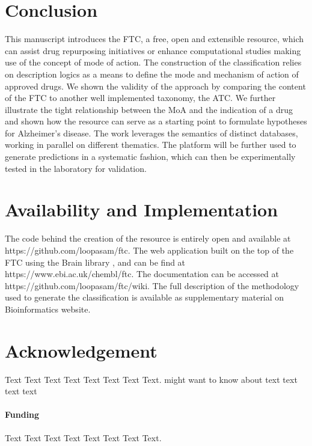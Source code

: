 \documentclass{bioinfo}
\begin{document}
\section{Conclusion}
This manuscript introduces the FTC, a free, open and extensible resource, which can assist drug repurposing 
initiatives or enhance computational studies making use of the concept of mode of action. The construction of 
the classification relies on description logics as a means to define the mode and mechanism of action of approved 
drugs. We shown the validity of the approach by comparing the content of the FTC to another well implemented taxonomy, 
the ATC. We further illustrate the tight relationship between the MoA and the indication of a drug and shown how the 
resource can serve as a starting point to formulate hypotheses for Alzheimer's disease. The work leverages the 
semantics of distinct databases, working in parallel on different thematics. The platform will be further used 
to generate predictions in a systematic fashion, which can then be experimentally tested in the laboratory for validation.

\section{Availability and Implementation}
The code behind the creation of the resource is entirely open and available 
at {{https://github.com/loopasam/ftc}}. The web application built on the top of the FTC using the Brain library \citep{Croset2013}, and can be 
find at {{https://www.ebi.ac.uk/chembl/ftc}}. The documentation can be accessed at {{https://github.com/loopasam/ftc/wiki}}. The full
description of the methodology used to generate the classification is available as supplementary material on Bioinformatics website.

\section*{Acknowledgement}
Text Text Text Text Text Text  Text Text.  \citealp{Boffelli03} might want to know about  text text text text

\paragraph{Funding\textcolon} Text Text Text Text Text Text  Text Text.












\end{document}
